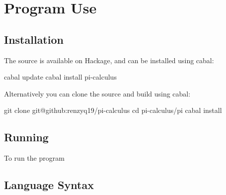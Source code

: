 \section{Program Use}

\subsection{Installation}

The source is available on Hackage, and can be installed using cabal:

\begin{code}
    cabal update
    cabal install pi-calculus
\end{code}

Alternatively you can clone the source and build using cabal:

\begin{code}
    git clone git@github:renzyq19/pi-calculus
    cd pi-calculus/pi
    cabal install
\end{code}

\subsection{Running}

To run the program

\subsection{Language Syntax}
